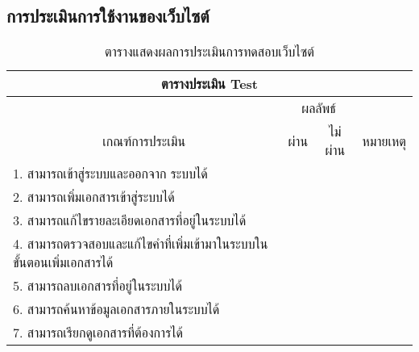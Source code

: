 \subsection{การประเมินการใช้งานของเว็บไซต์}
\begin{table}[H]
    \caption{ตารางแสดงผลการประเมินการทดสอบเว็บไซต์}\label{tbl:test2}
    \begin{tabular}{|l|l|l|l|}
    \hline
    \multicolumn{4}{|c|}{ตารางประเมิน Test}                                                               \\ \hline
    \multicolumn{1}{|c|}{}                         & \multicolumn{2}{c|}{ผลลัพธ์} & \multicolumn{1}{c|}{} \\ \cline{2-3}
    \multicolumn{1}{|c|}{\multirow{-2}{*}{เกณฑ์การประเมิน}} &
        \multicolumn{1}{c|}{ผ่าน} &
        \multicolumn{1}{c|}{ไม่ผ่าน} &
        \multicolumn{1}{c|}{\multirow{-2}{*}{หมายเหตุ}} \\ \hline
    1. สามารถเข้าสู่ระบบและออกจาก ระบบได้          & \cellcolor[HTML]{B5E645}  &  &                       \\ \hline
    2. สามารถเพิ่มเอกสารเข้าสู่ระบบได้             & \cellcolor[HTML]{B5E645}  &  &                       \\ \hline
    3. สามารถแก้ไขรายละเอียดเอกสารที่อยู่ในระบบได้ & \cellcolor[HTML]{B5E645}  &  &                       \\ \hline
    4. สามารถตรวจสอบและแก้ไขคำที่เพิ่มเข้ามาในระบบในขั้นตอนเพิ่มเอกสารได้ &
        \cellcolor[HTML]{B5E645} &
        &
        \\ \hline
    5. สามารถลบเอกสารที่อยู่ในระบบได้              & \cellcolor[HTML]{B5E645}  &  &                       \\ \hline
    6.   สามารถค้นหาข้อมูลเอกสารภายในระบบได้       & \cellcolor[HTML]{B5E645}  &  &                       \\ \hline
    7.   สามารถเรียกดูเอกสารที่ต้องการได้          & \cellcolor[HTML]{B5E645}  &  &                       \\ \hline
    \end{tabular}
    \end{table}
